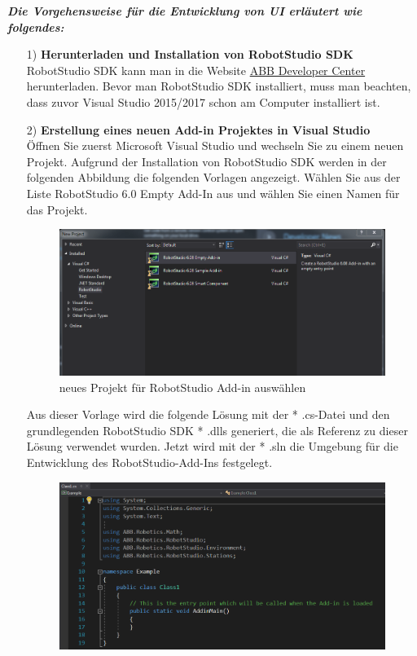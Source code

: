 \documentclass[14pt,a4paper,titlepage]{article}
\begin{document}
			\bigbreak
			
			\textbf{\emph{Die Vorgehensweise für die Entwicklung von UI erläutert wie folgendes:}}
			\\
			\begin{itemize}
				\item[1)]
				\textbf{Herunterladen und Installation von RobotStudio SDK} 
				\\
				RobotStudio SDK kann man in die Website \href{http://developercenter.robotstudio.com/downloads_robotstudio}{ABB Developer Center} herunterladen. Bevor man RobotStudio SDK installiert, muss man beachten, dass zuvor Visual Studio 2015/2017 schon am Computer installiert ist. 
				
				\item[2)] 
				\textbf{Erstellung eines neuen Add-in Projektes in Visual Studio}
				\\
				Öffnen Sie zuerst Microsoft Visual Studio und wechseln Sie zu einem neuen Projekt. Aufgrund der Installation von RobotStudio SDK werden in der folgenden Abbildung die folgenden Vorlagen angezeigt.
				Wählen Sie aus der Liste RobotStudio 6.0 Empty Add-In aus und wählen Sie einen Namen für das Projekt.\\
					\begin{figure}[h!]
					\centering
					\includegraphics[width=0.8\linewidth]{addin.png}
					\caption{neues Projekt für RobotStudio Add-in auswählen}
					\end{figure}
				Aus dieser Vorlage wird die folgende Lösung mit der * .cs-Datei und den grundlegenden RobotStudio SDK * .dlls generiert, die als Referenz zu dieser Lösung verwendet wurden. Jetzt wird mit der * .sln die Umgebung für die Entwicklung des RobotStudio-Add-Ins festgelegt.\\
					\begin{figure}[h!]
					\centering
					\includegraphics[width=0.8\linewidth]{cs.png}

\end{figure}
\end{itemize}
\end{document}
